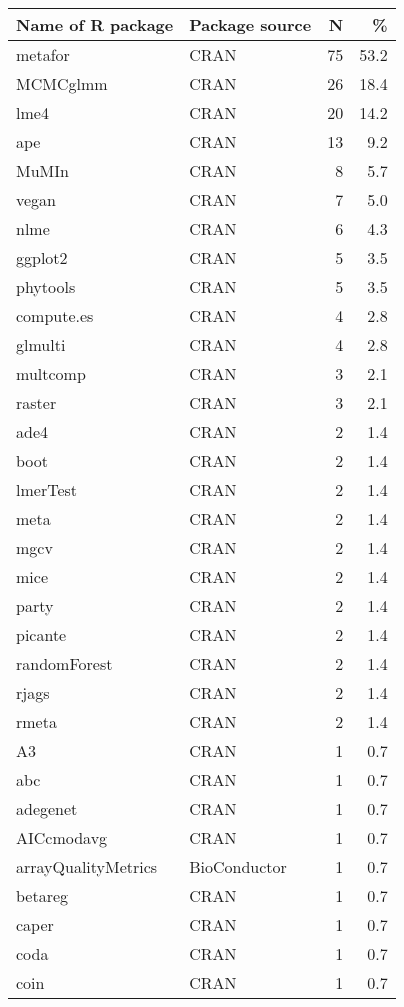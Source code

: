 \begin{table}[ht]
\centering
\begin{tabular}{llrr}
  \hline
Name of R package & Package source & N & \% \\ 
  \hline
metafor & CRAN & 75 & 53.2 \\ 
  MCMCglmm & CRAN & 26 & 18.4 \\ 
  lme4 & CRAN & 20 & 14.2 \\ 
  ape & CRAN & 13 & 9.2 \\ 
  MuMIn & CRAN & 8 & 5.7 \\ 
  vegan & CRAN & 7 & 5.0 \\ 
  nlme & CRAN & 6 & 4.3 \\ 
  ggplot2 & CRAN & 5 & 3.5 \\ 
  phytools & CRAN & 5 & 3.5 \\ 
  compute.es & CRAN & 4 & 2.8 \\ 
  glmulti & CRAN & 4 & 2.8 \\ 
  multcomp & CRAN & 3 & 2.1 \\ 
  raster & CRAN & 3 & 2.1 \\ 
  ade4 & CRAN & 2 & 1.4 \\ 
  boot & CRAN & 2 & 1.4 \\ 
  lmerTest & CRAN & 2 & 1.4 \\ 
  meta & CRAN & 2 & 1.4 \\ 
  mgcv & CRAN & 2 & 1.4 \\ 
  mice & CRAN & 2 & 1.4 \\ 
  party & CRAN & 2 & 1.4 \\ 
  picante & CRAN & 2 & 1.4 \\ 
  randomForest & CRAN & 2 & 1.4 \\ 
  rjags & CRAN & 2 & 1.4 \\ 
  rmeta & CRAN & 2 & 1.4 \\ 
  A3 & CRAN & 1 & 0.7 \\ 
  abc & CRAN & 1 & 0.7 \\ 
  adegenet & CRAN & 1 & 0.7 \\ 
  AICcmodavg & CRAN & 1 & 0.7 \\ 
  arrayQualityMetrics & BioConductor & 1 & 0.7 \\ 
  betareg & CRAN & 1 & 0.7 \\ 
  caper & CRAN & 1 & 0.7 \\ 
  coda & CRAN & 1 & 0.7 \\ 
  coin & CRAN & 1 & 0.7 \\ 

\end{tabular}
\end{table}
